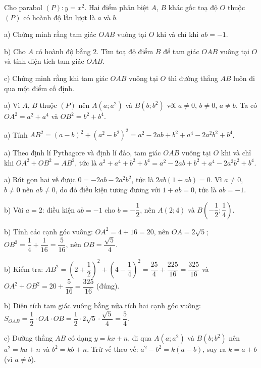 \begin{problem}[9DS-HSB2-050]
Cho parabol $(P)\colon y = x^2$. Hai điểm phân biệt $A$, $B$ khác gốc toạ độ $O$ thuộc $(P)$ có hoành độ lần lượt là $a$ và $b$.

a) Chứng minh rằng tam giác $OAB$ vuông tại $O$ khi và chỉ khi $ab = -1$.

b) Cho $A$ có hoành độ bằng $2$. Tìm toạ độ điểm $B$ để tam giác $OAB$ vuông tại $O$ và tính diện tích tam giác $OAB$.

c) Chứng minh rằng khi tam giác $OAB$ vuông tại $O$ thì đường thẳng $AB$ luôn đi qua một điểm cố định.

\begin{solution}
a) Vì $A$, $B$ thuộc $(P)$ nên $A(a; a^2)$ và $B(b; b^2)$ với $a \neq 0$, $b \neq 0$, $a \neq b$. Ta có $OA^2 = a^2 + a^4$ và $OB^2 = b^2 + b^4$.

a) Tính $AB^2 = (a - b)^2 + \left(a^2 - b^2\right)^2 = a^2 - 2ab + b^2 + a^4 - 2a^2b^2 + b^4$.

a) Theo định lí Pythagore và định lí đảo, tam giác $OAB$ vuông tại $O$ khi và chỉ khi $OA^2 + OB^2 = AB^2$, tức là $a^2 + a^4 + b^2 + b^4 = a^2 - 2ab + b^2 + a^4 - 2a^2b^2 + b^4$.

a) Rút gọn hai vế được $0 = -2ab - 2a^2b^2$, tức là $2ab(1 + ab) = 0$. Vì $a \neq 0$, $b \neq 0$ nên $ab \neq 0$, do đó điều kiện tương đương với $1 + ab = 0$, tức là $ab = -1$.

b) Với $a = 2$: điều kiện $ab = -1$ cho $b = -\dfrac{1}{2}$, nên $A(2; 4)$ và $B\left(-\dfrac{1}{2}; \dfrac{1}{4}\right)$.

b) Tính các cạnh góc vuông: $OA^2 = 4 + 16 = 20$, nên $OA = 2\sqrt{5}$; $OB^2 = \dfrac{1}{4} + \dfrac{1}{16} = \dfrac{5}{16}$, nên $OB = \dfrac{\sqrt{5}}{4}$.

b) Kiểm tra: $AB^2 = \left(2 + \dfrac{1}{2}\right)^2 + \left(4 - \dfrac{1}{4}\right)^2 = \dfrac{25}{4} + \dfrac{225}{16} = \dfrac{325}{16}$ và $OA^2 + OB^2 = 20 + \dfrac{5}{16} = \dfrac{325}{16}$ (đúng).

b) Diện tích tam giác vuông bằng nửa tích hai cạnh góc vuông: $S_{OAB} = \dfrac{1}{2} \cdot OA \cdot OB = \dfrac{1}{2} \cdot 2\sqrt{5} \cdot \dfrac{\sqrt{5}}{4} = \dfrac{5}{4}$.

c) Đường thẳng $AB$ có dạng $y = kx + n$, đi qua $A(a; a^2)$ và $B(b; b^2)$ nên $a^2 = ka + n$ và $b^2 = kb + n$. Trừ vế theo vế: $a^2 - b^2 = k(a - b)$, suy ra $k = a + b$ (vì $a \neq b$).


\end{solution}
\end{problem}
